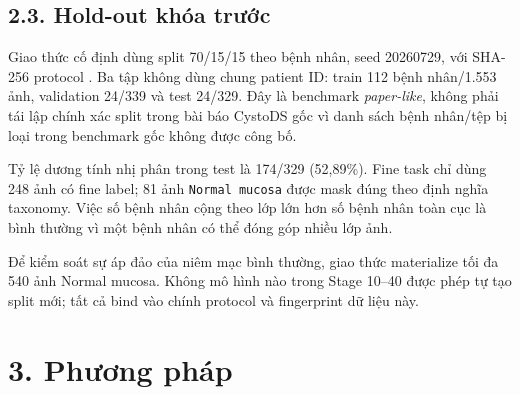 \documentclass[
  10pt,
  a4paper,
  twocolumn]{article}
\begin{document}
\subsection{2.3. Hold-out khóa
trước}\label{hold-out-khuxf3a-trux1b0ux1edbc}

Giao thức cố định dùng split 70/15/15 theo bệnh nhân, seed 20260729, với
SHA-256 protocol
\texttt{}.
Ba tập không dùng chung patient ID: train 112 bệnh nhân/1.553 ảnh,
validation 24/339 và test 24/329. Đây là benchmark \emph{paper-like},
không phải tái lập chính xác split trong bài báo CystoDS gốc vì danh
sách bệnh nhân/tệp bị loại trong benchmark gốc không được công bố.

\begin{table}[htbp]
\centering
\caption{Thống kê phân chia tập hold-out theo bệnh nhân và phân bố lớp.}
\label{tab:table2}
\vspace{2pt}
\end{table}

Tỷ lệ dương tính nhị phân trong test là 174/329 (52,89\%). Fine task chỉ
dùng 248 ảnh có fine label; 81 ảnh \texttt{Normal\ mucosa} được mask
đúng theo định nghĩa taxonomy. Việc số bệnh nhân cộng theo lớp lớn hơn
số bệnh nhân toàn cục là bình thường vì một bệnh nhân có thể đóng góp
nhiều lớp ảnh.

Để kiểm soát sự áp đảo của niêm mạc bình thường, giao thức materialize
tối đa 540 ảnh Normal mucosa. Không mô hình nào trong Stage 10--40 được
phép tự tạo split mới; tất cả bind vào chính protocol và fingerprint dữ
liệu này.

\section{3. Phương pháp}\label{phux1b0ux1a1ng-phuxe1p}
\end{document}
